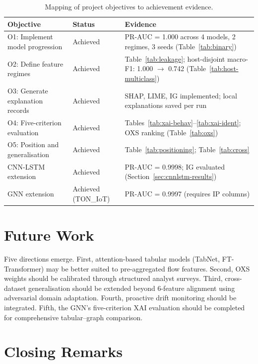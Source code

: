 \documentclass[12pt,a4paper]{report}
\begin{document}
\begin{table}[H]
\centering
\caption{Mapping of project objectives to achievement evidence.}
\label{tab:obj-achievement}
\small
\begin{tabular}{p{}lp{}}
\toprule
\textbf{Objective} & \textbf{Status} & \textbf{Evidence} \\
\midrule
O1: Implement model progression & Achieved & PR-AUC = 1.000 across 4 models, 2 regimes, 3 seeds (Table~\ref{tab:binary}) \\
\addlinespace
O2: Define feature regimes & Achieved & Table~\ref{tab:leakage}; host-disjoint macro-F1: 1.000 $\to$ 0.742 (Table~\ref{tab:host-multiclass}) \\
\addlinespace
O3: Generate explanation records & Achieved & SHAP, LIME, IG implemented; local explanations saved per run \\
\addlinespace
O4: Five-criterion evaluation & Achieved & Tables~\ref{tab:xai-behav}--\ref{tab:xai-ident}; OXS ranking (Table~\ref{tab:oxs}) \\
\addlinespace
O5: Position and generalisation & Achieved & Table~\ref{tab:positioning}; Table~\ref{tab:cross} \\
\addlinespace
CNN-LSTM extension & Achieved & PR-AUC = 0.9998; IG evaluated (Section~\ref{sec:cnnlstm-results}) \\
\addlinespace
GNN extension & Achieved (TON\_IoT) & PR-AUC = 0.9997 (requires IP columns) \\
\bottomrule
\end{tabular}
\end{table}

\section{Future Work}
\label{sec:future}

Five directions emerge. First, attention-based tabular models (TabNet, FT-Transformer) may be better suited to pre-aggregated flow features. Second, OXS weights should be calibrated through structured analyst surveys. Third, cross-dataset generalisation should be extended beyond 6-feature alignment using adversarial domain adaptation. Fourth, proactive drift monitoring should be integrated. Fifth, the GNN's five-criterion XAI evaluation should be completed for comprehensive tabular--graph comparison.

\section{Closing Remarks}
\label{sec:closing}
\end{document}
